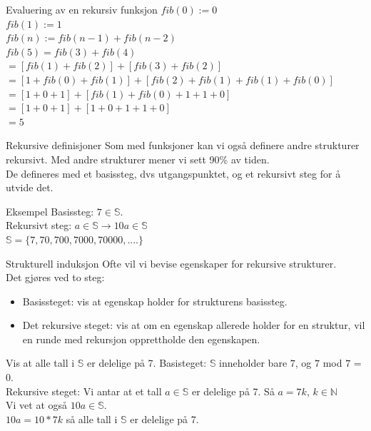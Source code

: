 \begin{frame}{Evaluering av en rekursiv funksjon}
    $fib(0) := 0$\\
    $fib(1) := 1$\\
    $fib(n) := fib(n-1) + fib(n-2)$\\
    
    \pause
    $fib(5) = fib(3) + fib(4)$\\
    $ = [fib(1) + fib(2)] + [fib(3) + fib(2)]$\\
    $ = [1 + fib(0) + fib(1)] + [fib(2) + fib(1) + fib(1) + fib(0)]$\\
    $ = [1 + 0 + 1] + [fib(1) + fib(0) + 1 + 1 + 0]$\\
    $ = [1 + 0 + 1] + [1 + 0 + 1 + 1 + 0]$\\
    $ = 5$
\end{frame}

\begin{frame}{Rekursive definisjoner}
    Som med funksjoner kan vi også definere andre strukturer rekursivt. Med andre strukturer mener vi sett 90\% av tiden.\\
    
    De defineres med et basissteg, dvs utgangspunktet, og et rekursivt steg for å utvide det.\\
    
    \pause
    \begin{block}{Eksempel}
        Basissteg: $7 \in \mathbb{S}$.\\
        Rekursivt steg: $a \in \mathbb{S} \rightarrow 10a \in \mathbb{S}$\\
        $\mathbb{S} = \{7, 70, 700, 7000, 70000, ....\}$
    \end{block}
\end{frame}

\begin{frame}{Strukturell induksjon}
    Ofte vil vi bevise egenskaper for rekursive strukturer.\\
    Det gjøres ved to steg:\\
    \begin{itemize}
        \item Basissteget: vis at egenskap holder for strukturens basissteg.
        \item Det rekursive steget: vis at om en egenskap allerede holder for en struktur, vil en runde med rekursjon opprettholde den egenskapen.
    \end{itemize}
    
    \pause
    \begin{block}{Vis at alle tall i $\mathbb{S}$ er delelige på 7.}
        Basisteget: $\mathbb{S}$ inneholder bare $7$, og $7$ mod $7$ = 0. \checkmark\\
        Rekursive steget: Vi antar at et tall $a \in \mathbb{S}$ er delelige på 7. Så $a = 7k$, $k \in \mathbb{N}$\\
        Vi vet at også $10a \in \mathbb{S}$.\\
        $10a=10 * 7k$ så alle tall i $\mathbb{S}$ er delelige på 7.\checkmark
    \end{block}
\end{frame}

